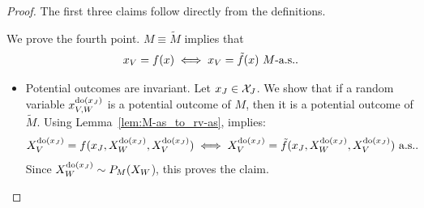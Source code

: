 \begin{proof}
  The first three claims follow directly from the definitions.
  

  We prove the fourth point.
  $M \equiv \tilde{M}$ implies that 
    \begin{equation}\label{eq:prp:equivalent_scms}
      x_V = f(x) \iff x_V = \tilde{f}(x)\ M\text{-a.s.}.
    \end{equation}

    \begin{itemize}
      \item
  Potential outcomes are invariant.
          Let $x_J \in \mathcal{X}_J$. 
          We show that if a random variable $x^{\operatorname{do}(x_J)}_{V,W}$ is a potential outcome of $M$, then it is a potential outcome of $\tilde{M}$.
          Using Lemma~\ref{lem:M-as_to_rv-as},  implies:
                  $$X_V^{\operatorname{do}(x_{J})} = f(x_J,X_W^{\operatorname{do}(x_{J})},X_V^{\operatorname{do}(x_{J})}) \iff X_V^{\operatorname{do}(x_{J})} = \tilde{f}(x_J,X_W^{\operatorname{do}(x_{J})},X_V^{\operatorname{do}(x_{J})}) \text{ a.s.}.$$
          Since $X_W^{\operatorname{do}(x_{J})} \sim P_M(X_W$), this proves the claim.


\end{itemize}
\end{proof}
